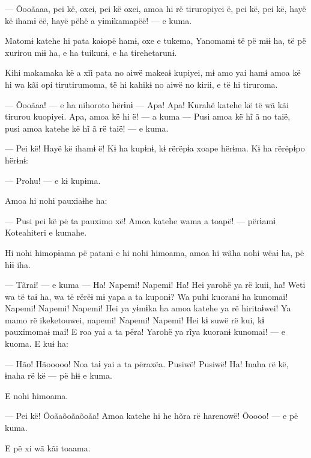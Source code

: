--- Õooãaaa, pei kë, oxei, pei kë oxei, amoa hi rë tiruropiyei ë, pei
kë, pei kë, hayë kë ihamɨ ëë, hayë pëhë a yɨmɨkamapëë! --- e kuma. 

Matomɨ katehe hi pata kaɨopë hamɨ, oxe e tukema, Yanomamɨ të pë mɨɨ ha,
të pë xurirou mɨɨ ha, e ha tuikunɨ, e ha tirehetarunɨ. 

Kihi makamaka kë a xĩi pata no aiwë makeaɨ kupiyei, mɨ amo yai hamɨ amoa
kë hi wa kãi opi tirutirumoma, të hi kahikɨ no aiwë no kirii, e të hi
tiruroma. 

 

--- Õooãaa! --- e ha nihoroto hërɨnɨ --- Apa! Apa! Kurahë katehe kë të
wã kãi tirurou kuopiyei. Apa, amoa kë hi ë! --- a kuma --- Pusi amoa kë
hĩ ã no taië, pusi amoa katehe kë hĩ ã rë taië! --- e kuma. 

--- Pei kë! Hayë kë ihamɨ ë! Kɨ ha kupɨnɨ, kɨ rërëpɨa xoape hërɨma. Kɨ
ha rërëpɨpo hërɨnɨ: 

--- Prohu! --- e kɨ kupɨma. 

Amoa hi nohi pauxiaɨhe ha: 

--- Pusi pei kë pë ta pauximo xë! Amoa katehe wama a toapë! --- përɨamɨ
Koteahiteri e kumahe. 

Hi nohi himopɨama pë patanɨ e hi nohi himoama, amoa hi wãha nohi wëaɨ
ha, pë hɨɨ iha. 

--- Tãrai! --- e kuma --- Ha! Napemi! Napemi! Ha! Hei yarohë ya rë kuii,
ha! Weti wa të taɨ ha, wa të rërëɨ mɨ yapa a ta kuponɨ? Wa puhi kuoranɨ
ha kunomai! Napemi! Napemi! Napemi! Hei ya yɨmɨka ha amoa katehe ya rë
hiritaɨwei! Ya mamo rë ikeketouwei, napemi! Napemi! Napemi! Hei kɨ suwë
rë kui, kɨ pauximomaɨ mai! E roa yai a ta përa! Yarohë ya rĩya kuoranɨ
kunomai! --- e kuoma. E kuɨ ha: 

--- Hão! Hãooooo! Noa taɨ yai a ta përaxëa. Pusiwë! Pusiwë! Ha! Ɨnaha rë
kë, ɨnaha rë kë --- pë hɨɨ e kuma. 

E nohi himoama. 

--- Pei kë! Õoãaõoãaõoãa! Amoa katehe hi he hõra rë harenowë! Õoooo! ---
e pë kuma. 

E pë xi wã kãi toaama.

 

 

 

 

 
